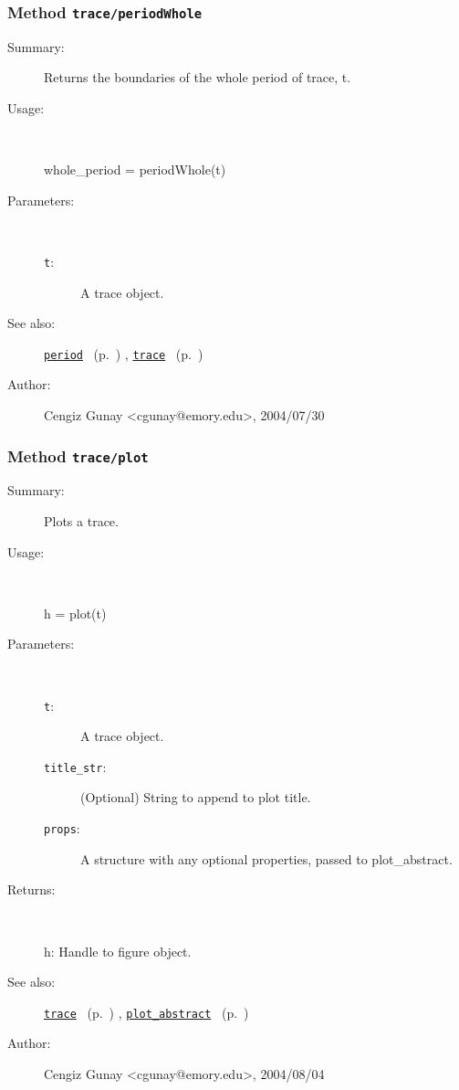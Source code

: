 \subsubsection[Method \texttt{periodWhole}]{Method \texttt{trace/periodWhole}}%
%
\label{ref_trace__periodWhole}%
\hypertarget{ref_trace__periodWhole}{}%
\begin{description}
\item[Summary:]Returns the boundaries of the whole period of trace, t. 
%
\item[Usage:]~%
\begin{lyxcode}%
whole\_period = periodWhole(t)
%
\end{lyxcode}%
%
%
\item[Parameters:]~
\begin{description}%
\item[\texttt{t}:]
 A trace object.
\end{description}%
%
%
%
\item[See also:]%
\hyperlink{ref_period}{\texttt{period}}%
\ (p.~\pageref{ref_period})%
%
, \hyperlink{ref_trace}{\texttt{trace}}%
\ (p.~\pageref{ref_trace})%
%
%
\item[Author:]%
Cengiz Gunay <cgunay@emory.edu>, 2004/07/30
%
\end{description}
\methodline%
\subsubsection[Method \texttt{plot}]{Method \texttt{trace/plot}}%
%
\label{ref_trace__plot}%
\hypertarget{ref_trace__plot}{}%
\begin{description}
\item[Summary:]Plots a trace.
%
\item[Usage:]~%
\begin{lyxcode}%
h = plot(t)
%
\end{lyxcode}%
%
%
\item[Parameters:]~
\begin{description}%
\item[\texttt{t}:]
 A trace object.
\item[\texttt{title\_str}:]
 (Optional) String to append to plot title.
\item[\texttt{props}:]
 A structure with any optional properties, passed to plot\_abstract.
\end{description}%
%
\item[Returns:
]~

	h: Handle to figure object.
%
%
\item[See also:]%
\hyperlink{ref_trace}{\texttt{trace}}%
\ (p.~\pageref{ref_trace})%
%
, \hyperlink{ref_plot_abstract}{\texttt{plot\_abstract}}%
\ (p.~\pageref{ref_plot_abstract})%
%
%
\item[Author:]%
Cengiz Gunay <cgunay@emory.edu>, 2004/08/04
%
\end{description}
\methodline%

